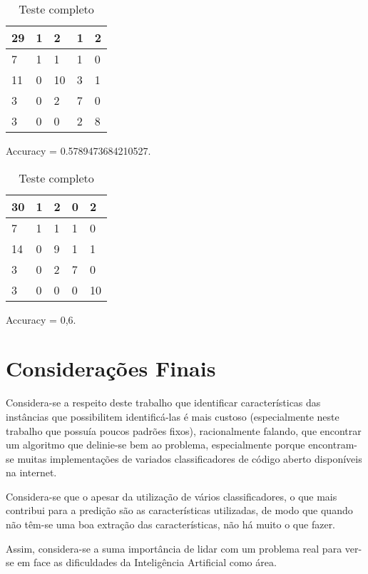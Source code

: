\documentclass[12pt]{article}
\begin{document}
\begin{table}[H]
\centering
\caption{Teste completo}
\label{my-label}
\begin{tabular}{|l|l|l|l|l|}
\hline
29 & 1 & 2  & 1 & 2 \\ \hline
7  & 1 & 1  & 1 & 0 \\ \hline
11 & 0 & 10 & 3 & 1 \\ \hline
3  & 0 & 2  & 7 & 0 \\ \hline
3  & 0 & 0  & 2 & 8 \\ \hline
\end{tabular}
\end{table}
Accuracy = 0.5789473684210527.




\begin{table}[H]
\centering
\caption{Teste completo}
\label{my-label}
\begin{tabular}{|l|l|l|l|l|}
\hline
30 & 1 & 2 & 0 & 2  \\ \hline
7  & 1 & 1 & 1 & 0  \\ \hline
14 & 0 & 9 & 1 & 1  \\ \hline
3  & 0 & 2 & 7 & 0  \\ \hline
3  & 0 & 0 & 0 & 10 \\ \hline
\end{tabular}
\end{table}
Accuracy = 0,6.




\section{Considerações Finais}

	Considera-se a respeito deste trabalho que identificar características das instâncias que possibilitem identificá-las é mais custoso (especialmente neste trabalho que possuía poucos padrões fixos), racionalmente falando, que encontrar um algoritmo que delinie-se bem ao problema, especialmente porque encontram-se muitas implementações de variados classificadores de código aberto disponíveis na internet.

	Considera-se que o apesar da utilização de vários classificadores, o que mais contribui para a predição são as características utilizadas, de modo que quando não têm-se uma boa extração das características, não há muito o que fazer.

	Assim, considera-se a suma importância de lidar com um problema real para ver-se em face as dificuldades da Inteligência Artificial como área.

{}

\end{document}
